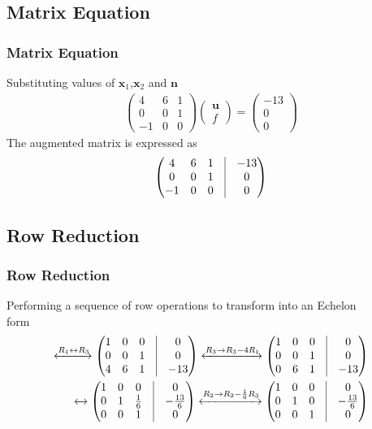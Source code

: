 \documentclass{beamer}
\theoremstyle{remark}
\providecommand{\norm}[1]{\lVert#1\rVert}
\newcommand{\myvec}[1]{\ensuremath{\begin{pmatrix}#1\end{pmatrix}}}
\let\vec\mathbf
\numberwithin{equation}{section}
\begin{document}
\subsection{Matrix Equation}
\begin{frame}
\frametitle{Matrix Equation}
Substituting values of $\vec{x}_1$,$\vec{x}_2$ and $\vec{n}$
\begin{align}
	\myvec{
	        4 & 6 & 1\\
	        0 & 0 & 1\\
-1 & 0 & 0}
	\myvec{\vec{u}\\f} = 
	\myvec{-13 \\ 0 \\ 0}
\end{align}
The augmented matrix is expressed as
\begin{align}
	\myvec{
	        4 & 6 & 1 & \vrule & -13\\
	       0 & 0 & 1 & \vrule & 0\\
-1 & 0 & 0 & \vrule & 0}
\end{align}


\end{frame}
\subsection{Row Reduction}
\begin{frame}
\frametitle{Row Reduction}
Performing a sequence of row operations to transform into an Echelon \\form
\begin{align*}
	\xleftrightarrow[]{{R_1\leftrightarrow R_3}}
	\myvec{1 & 0 & 0 & \vrule & 0\\
	        0 &  0 & 1 & \vrule & 0\\
	        4 & 6 & 1 & \vrule & -13}
	\xleftrightarrow[]{{R_3\rightarrow R_3-4R_1}}
	\myvec{1 & 0 & 0 & \vrule & 0\\
	        0 &  0 & 1 & \vrule & 0\\
	        0 &  6 & 1 & \vrule & -13}\\
	\xleftrightarrow[]{{}}
	\myvec{ 1 & 0 & 0 & \vrule & 0\\
	        0 &  1 & \frac{1}{6} & \vrule & -\frac{13}{6}\\
	        0 &  0 & 1 & \vrule & 0}	
	\xleftrightarrow[]{{R_2\rightarrow R_2-\frac{1}{6}R_3}}
	\myvec{ 1 &  0 & 0 & \vrule & 0\\
	        0 &  1 & 0 & \vrule & -\frac{13}{6}\\
	        0 &  0 & 1 & \vrule & 0}
\end{align*}
%
\end{frame}
\end{document}
